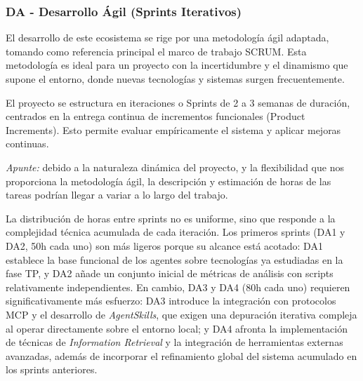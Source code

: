 \documentclass[11pt, letterpaper]{article}
\begin{document}
\subsubsection{DA - Desarrollo Ágil (Sprints Iterativos)}
\label{sec:da}

El desarrollo de este ecosistema se rige por una metodología ágil adaptada, tomando como referencia principal el marco de trabajo SCRUM. Esta metodología es ideal para un proyecto con la incertidumbre y el dinamismo que supone el entorno, donde nuevas tecnologías y sistemas surgen frecuentemente. 

El proyecto se estructura en iteraciones o Sprints de 2 a 3 semanas de duración, centrados en la entrega continua de incrementos funcionales (Product Increments). Esto permite evaluar empíricamente el sistema y aplicar mejoras continuas.

\textit{Apunte:} debido a la naturaleza dinámica del proyecto, y la flexibilidad que nos proporciona la metodología ágil, la descripción y estimación de horas de las tareas podrían llegar a variar a lo largo del trabajo.

La distribución de horas entre sprints no es uniforme, sino que responde a la complejidad técnica acumulada de cada iteración. Los primeros sprints (DA1 y DA2, 50h cada uno) son más ligeros porque su alcance está acotado: DA1 establece la base funcional de los agentes sobre tecnologías ya estudiadas en la fase TP, y DA2 añade un conjunto inicial de métricas de análisis con scripts relativamente independientes. En cambio, DA3 y DA4 (80h cada uno) requieren significativamente más esfuerzo: DA3 introduce la integración con protocolos MCP y el desarrollo de \textit{AgentSkills}, que exigen una depuración iterativa compleja al operar directamente sobre el entorno local; y DA4 afronta la implementación de técnicas de \textit{Information Retrieval} y la integración de herramientas externas avanzadas, además de incorporar el refinamiento global del sistema acumulado en los sprints anteriores.
\end{document}

